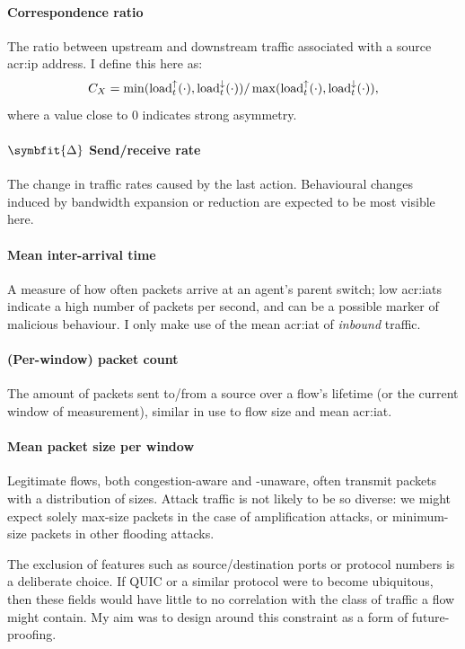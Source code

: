 \paragraph{Correspondence ratio}
The ratio between upstream and downstream traffic associated with a source \gls{acr:ip} address.
I define this here as:
$$C_X = \min(\operatorname{load}^{\uparrow}_{t}(\cdot), \operatorname{load}^{\downarrow}_{t}(\cdot))/\max(\operatorname{load}^{\uparrow}_{t}(\cdot), \operatorname{load}^{\downarrow}_{t}(\cdot)),$$
where a value close to 0 indicates strong asymmetry.

\paragraph{$\symbfit{\Delta}$ Send/receive rate}
The change in traffic rates caused by the last action.
Behavioural changes induced by bandwidth expansion or reduction are expected to be most visible here.

\paragraph{Mean inter-arrival time}
A measure of how often packets arrive at an agent's parent switch; low \glspl{acr:iat} indicate a high number of packets per second, and can be a possible marker of malicious behaviour.
I only make use of the mean \gls{acr:iat} of \emph{inbound} traffic.

\paragraph{(Per-window) packet count}
The amount of packets sent to/from a source over a flow's lifetime (or the current window of measurement), similar in use to flow size and mean \gls{acr:iat}.

\paragraph{Mean packet size per window}
Legitimate flows, both congestion-aware and -unaware, often transmit packets with a distribution of sizes.
Attack traffic is not likely to be so diverse: we might expect solely max-size packets in the case of amplification attacks, or minimum-size packets in other flooding attacks.

The exclusion of features such as source/destination ports or protocol numbers is a deliberate choice.
If QUIC or a similar protocol were to become ubiquitous, then these fields would have little to no correlation with the class of traffic a flow might contain.
My aim was to design around this constraint as a form of future-proofing.

